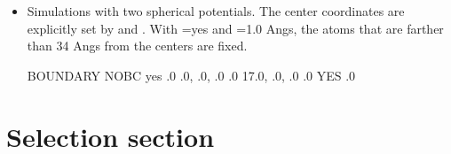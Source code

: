 \documentclass[a4paper,11pt,oneside,english]{sphinxmanual}
\begin{document}
\begin{itemize}
\begin{sphinxVerbatim}[commandchars=\\\{\}]
\PYG{o}{[}SELECTION\PYG{o}{]}
...
          ano:1 or ano:100
\end{sphinxVerbatim}

\begin{sphinxadmonition}{note}{Note:}
Be careful not to set too many spheres because it may slow down
the performance. If you want to set the spheres around a protein, instead
of specifying all atoms in a protein, select part of the atoms, for example, by

\begin{sphinxVerbatim}[commandchars=\\\{\}]
  segid:PROA and CA
\end{sphinxVerbatim}
\end{sphinxadmonition}

\item {} 
Simulations with two spherical potentials. The center
coordinates are explicitly set by  and .
With  =yes and  =1.0 Angs, the atoms that are
farther than 34 Angs from the centers are fixed.

\begin{sphinxVerbatim}[commandchars=\\\{\}]
\PYG{o}{[}BOUNDARY\PYG{o}{]}
           NOBC      
  yes
       .0
       
     
         .0, .0, .0    
        .0
        \PYGZhy{}17.0, .0, .0    
        .0
        YES
      .0
\end{sphinxVerbatim}

\end{itemize}


\chapter{Selection section}
\label{\detokenize{11_Selection:selection-section}}\label{\detokenize{11_Selection:selection}}\label{\detokenize{11_Selection::doc}}
\end{document}

